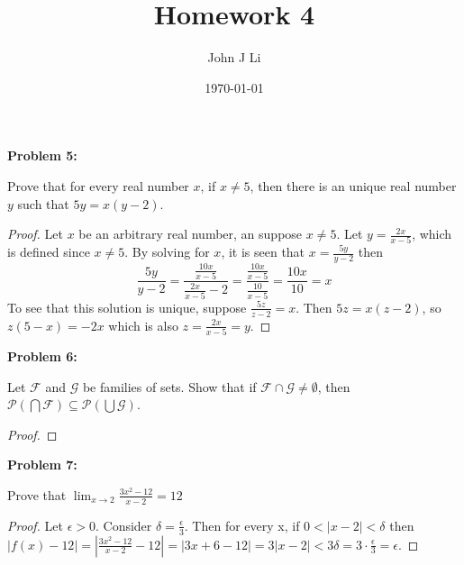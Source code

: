 \documentclass{article}
\title{Homework 4}
\date{\today}
\author{John J Li}
\begin{document}
    \maketitle
    \newpage



    \textbf{Problem 5:}

    Prove that for every real number $x$, if $x\neq 5$, then there is an unique real number $y$ such that
    $5y=x(y-2)$.

    \begin{proof}
        Let $x$ be an arbitrary real number, an suppose $x\neq 5$. Let $y=\frac{2x}{x-5}$, 
        which is defined since $x\neq 5$. By solving for $x$, it is seen that
        $x=\frac{5y}{y-2}$ then 
        \[\frac{5y}{y-2}=\frac{\frac{10x}{x-5}}{\frac{2x}{x-5}-2}=\frac{\frac{10x}{x-5}}{\frac{10}{x-5}}=\frac{10x}{10}=x\]
        To see that this solution is unique, suppose $\frac{5z}{z-2}=x$. Then $5z=x(z-2)$, so $z(5-x)=-2x$ which is also
        $z=\frac{2x}{x-5}=y$.
    \end{proof}


    \textbf{Problem 6:}

    Let $\mathcal{F}$ and $\mathcal{G}$ be families of sets. Show that if $\mathcal{F}\cap\mathcal{G}\neq\emptyset$,
    then $\mathcal{P}(\bigcap\mathcal{F})\subseteq\mathcal{P}(\bigcup\mathcal{G})$.

    \begin{proof}
        
    \end{proof}


    \textbf{Problem 7:}

    Prove that $\lim_{x\rightarrow 2}\frac{3x^2-12}{x-2}=12$

    \begin{proof}
        Let $\epsilon > 0$. Consider $\delta = \frac{\epsilon}{3}$. Then for every x,
        if $0<|x-2|<\delta$ then 
        $|f(x)-12|=|\frac{3x^2-12}{x-2}-12|=|3x+6-12|=3|x-2|<3\delta=3\cdot\frac{\epsilon}{3}=\epsilon$.
    \end{proof}

    

    
\end{document}
